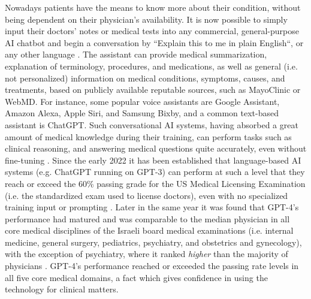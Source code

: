 Nowadays patients have the means to know more about their condition, without being dependent on their physician's availability. It is now possible to simply input their doctors' notes or medical tests into any commercial, general-purpose AI chatbot and begin a conversation by ``Explain this to me in plain English``, or any other language \cite{llmsmodernmedicine2023}. The assistant can provide medical summarization, explanation of terminology, procedures, and medications, as well as general (i.e. not personalized) information on medical conditions, symptoms, causes, and treatments, based on publicly available reputable sources, such as MayoClinic or WebMD. For instance, some popular voice assistants are Google Assistant, Amazon Alexa, Apple Siri, and Samsung Bixby, and a common text-based assistant is ChatGPT. Such conversational AI systems, having absorbed a great amount of medical knowledge during their training, can perform tasks such as clinical reasoning, and answering medical questions quite accurately, even without fine-tuning \cite{chaGPTpassesUSMLE2023, gpt4israeli2024}. Since the early 2022 it has been established that language-based AI systems (e.g. ChatGPT running on GPT-3) can perform at such a level that they reach or exceed the 60\% passing grade for the US Medical Licensing Examination (i.e. the standardized exam used to license doctors), even with no specialized training input or prompting \cite{chaGPTpassesUSMLE2023}. Later in the same year it was found that GPT-4's performance had matured and was comparable to the median physician in all core medical disciplines of the Israeli board medical examinations (i.e. internal medicine, general surgery, pediatrics, psychiatry, and obstetrics and gynecology), with the exception of psychiatry, where it ranked \textit{higher} than the majority of physicians \cite{gpt4israeli2024}. GPT-4's performance reached or exceeded the passing rate levels in all five core medical domains, a fact which gives confidence in using the technology for clinical matters.

